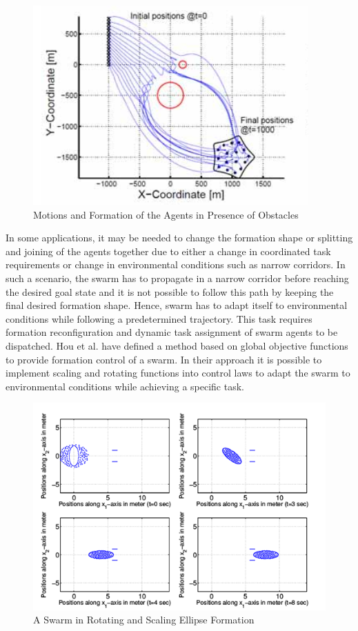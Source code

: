 \begin{figure}[H]
	\caption{Motions and Formation of the Agents in Presence of Obstacles \cite{17}} \label{samitha_obstacle}
	\centering
	\includegraphics[scale = 0.7]{samitha}
\end{figure} 

In some applications, it may be needed to change the formation shape or splitting and joining of the agents together due to either a change in coordinated task requirements or change in environmental conditions such as narrow corridors. In such a scenario, the swarm has to propagate in a narrow corridor before reaching the desired goal state and it is not possible to follow this path by keeping the final desired formation shape. Hence, swarm has to adapt itself to environmental conditions while following a predetermined trajectory. This task requires formation reconfiguration and dynamic task assignment of swarm agents to be dispatched. Hou et al. \cite{8} have defined a method based on global objective functions to provide formation control of a swarm. In their approach it is possible to implement scaling and rotating functions into control laws to adapt the swarm to environmental conditions while achieving a specific task. 

\begin{figure}[H]
	\caption{A Swarm in Rotating and Scaling Ellipse Formation \cite{8}} \label{slotine_fig_ref}
	\centering
	\includegraphics[scale = 1]{slotine}
\end{figure} 

